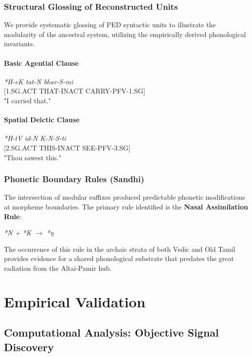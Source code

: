\documentclass[11pt,oneside,openany]{book}
\begin{document}
\section{Structural Glossing of Reconstructed Units}
We provide systematic glossing of PED syntactic units to illustrate the modularity of the ancestral system, utilizing the empirically derived phonological invariants.

\subsection{Basic Agential Clause}
\begin{center}
\textit{*H-eK tat-N bhar-S-mi} \\
\small [1.SG.ACT THAT-INACT CARRY-PFV-1.SG] \\
\normalsize "I carried that."
\end{center}

\subsection{Spatial Deictic Clause}
\begin{center}
\textit{*H-tV id-N K-N-S-ti} \\
\small [2.SG.ACT THIS-INACT SEE-PFV-3.SG] \\
\normalsize "Thou sawest this."
\end{center}

\section{Phonetic Boundary Rules (Sandhi)}
The intersection of modular suffixes produced predictable phonetic modifications at morpheme boundaries. The primary rule identified is the \textbf{Nasal Assimilation Rule}:
\begin{center}
\textit{*N + *K $\rightarrow$ *ŋ}
\end{center}
The occurrence of this rule in the archaic strata of both Vedic and Old Tamil provides evidence for a shared phonological substrate that predates the great radiation from the Altai-Pamir hub.



\part{Empirical Validation}
\chapter{Computational Analysis: Objective Signal Discovery}
\end{document}
